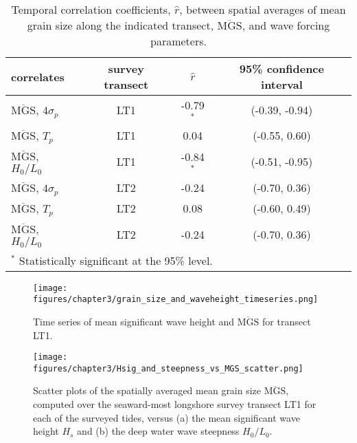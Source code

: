 \begin{table}[tbp!]
	\caption[Temporal correlation coefficients: mean grain size and wave parameters]{Temporal correlation coefficients, $\hat{r}$, between spatial averages of mean grain size along the indicated transect, $\overline{\mathrm{MGS}}$, and wave forcing parameters.\label{table:temporal_correlations}} 
	\centering
	\begin{tabular}{lccc}
		\hline
		correlates & survey transect & $\hat{r}$ & 95\% confidence interval\\
		\hline
		$\overline{\mathrm{MGS}}$, $4\sigma_p$ & LT1 & -0.79$^{*}$ & (-0.39, -0.94)\\
		$\overline{\mathrm{MGS}}$, $T_p$ & LT1 & 0.04 & (-0.55, 0.60)\\
		$\overline{\mathrm{MGS}}$, $H_0/L_0$ & LT1 & -0.84$^{*}$ & (-0.51, -0.95)\\
		$\overline{\mathrm{MGS}}$, $4\sigma_p$ & LT2 & -0.24 & (-0.70, 0.36)\\
		$\overline{\mathrm{MGS}}$, $T_p$ & LT2 & 0.08 & (-0.60, 0.49)\\
		$\overline{\mathrm{MGS}}$, $H_0/L_0$ & LT2 & -0.24 & (-0.70, 0.36)\\
		\hline
		\multicolumn{4}{l}{$^{*}$ Statistically significant at the 95\% level.}
	\end{tabular}
\end{table}

\begin{figure}[tbp] %
	\begin{center}
	\texttt{[image: figures/chapter3/grain\_size\_and\_waveheight\_timeseries.png]}
	\caption[Time series of mean significant wave height and mean surficial grian size]{Time series of mean significant wave height and $\overline{\mathrm{MGS}}$ for transect LT1.\label{fig:hsig_mgs}}
	\end{center}
\end{figure}

\begin{figure}[tbp] %
	\begin{center}
		\texttt{[image: figures/chapter3/Hsig\_and\_steepness\_vs\_MGS\_scatter.png]}
		\caption[Mean surfical grain size versus significant wave height, wave steepness]{Scatter plots of the spatially averaged mean grain size $\overline{\mathrm{MGS}}$, computed over the seaward-most longshore survey transect LT1 for each of the surveyed tides, versus (a) the mean significant wave height $H_s$ and (b) the deep water wave steepness $H_0/L_0$. \label{fig:hsig_steepness_mgs_scatter}}
	\end{center}
\end{figure}

